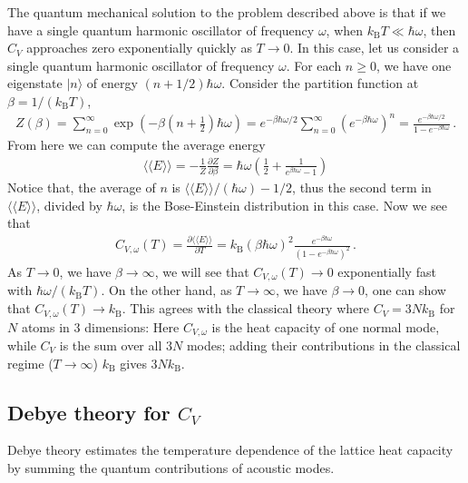 \documentclass[11pt, oneside]{book}
\theoremstyle{break}
\theoremstyle{break}
\newcommand{\pd}{\partial}
\begin{document}
The quantum mechanical solution to the problem described above is that if we have a single quantum harmonic oscillator of frequency $\omega$, when $k_{\text{B}}T \ll \hbar\omega$, then $C_{V}$ approaches zero exponentially quickly as $T \to 0$. In this case, let us consider a single quantum harmonic oscillator of frequency $\omega$. For each $n \geq 0$, we have one eigenstate $|n\rangle$ of energy $(n+1/2)\hbar\omega$. Consider the partition function at $\beta = 1/(k_{\text{B}}T)$, 
\begin{align*}
Z(\beta) = \sum_{n=0}^\infty \exp\left(
-\beta \left(n+\frac{1}{2}\right) \hbar\omega
\right) = e^{-\beta \hbar\omega/2} \sum_{n=0}^\infty \left(
e^{-\beta\hbar\omega}
\right)^n = \frac{e^{-\beta \hbar\omega/2}}{1 - e^{-\beta\hbar\omega}}\,.
\end{align*}
From here we can compute the average energy
\begin{align*}
\langle\langle E \rangle\rangle = -\frac{1}{Z}\frac{\pd Z}{\pd \beta} = \hbar\omega\left(\frac{1}{2} + 
\frac{1}{e^{\beta \hbar\omega}-1}
\right)
\end{align*}
Notice that, the average of $n$ is $\langle\langle E \rangle\rangle / (\hbar\omega) - 1/2$, thus the second term in $\langle\langle E\rangle\rangle$, divided by $\hbar\omega$, is the Bose-Einstein distribution in this case. Now we see that 
\begin{align*}
C_{V, \omega}(T) = \frac{\pd \langle\langle E\rangle\rangle}{\pd T} = k_{\text{B}} \left( 
\beta \hbar\omega
\right)^2 \frac{e^{-\beta \hbar\omega}}{(1 - e^{-\beta \hbar\omega})^2}\,.
\end{align*}
As $T \to 0$, we have $\beta \to \infty$, we will see that $C_{V,\omega}(T) \to 0$ exponentially fast with $ \hbar\omega/(k_{\text{B}}T)$. On the other hand, as $T \to \infty$, we have $\beta \to 0$, one can show that $C_{V,\omega}(T) \to k_{\text{B}}$. This agrees with the classical theory where $C_V = 3N k_{\text{B}}$ for $N$ atoms in $3$ dimensions: Here $C_{V,\omega}$ is the heat capacity of one normal mode, while $C_V$ is the sum over all $3N$ modes; adding their contributions in the classical regime ($T\to\infty$) $k_{\text{B}}$ gives $3Nk_{\text{B}}$.

\subsection{Debye theory for $C_V$}
Debye theory estimates the temperature dependence of the lattice heat capacity by summing the quantum contributions of acoustic modes.\\
\end{document}
